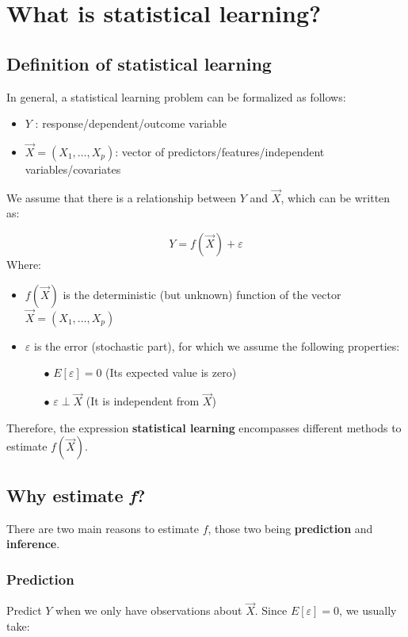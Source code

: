 \graphicspath{{chapters/images/0201/}}

\chapter{What is statistical learning?}
  
  \section{Definition of statistical learning}
    In general, a statistical learning problem can be formalized as follows:

    \begin{itemize}
      \item $Y$ : response/dependent/outcome variable
      \item $\vec{X} = (X_1, \dots, X_p)$: vector of predictors/features/independent variables/covariates
    \end{itemize}
    We assume that there is a relationship between $Y$ and $\vec{X}$, which can be written as:

    $$Y = f(\vec{X}) + \varepsilon $$
    Where:
    \begin{itemize}
      \item $f(\vec{X})$ is the deterministic (but unknown) function of the vector $\vec{X} = (X_1, \dots, X_p)$
      \item $\varepsilon$ is the error (stochastic part), for which we assume the following properties:
      \begin{itemize}
        \item[$\bullet$] $E[\varepsilon] = 0$ (Its expected value is zero)
        \item[$\bullet$] $\varepsilon \perp \vec{X}$ (It is independent from $\vec{X}$)
      \end{itemize}
    \end{itemize}
    Therefore, the expression \textbf{statistical learning} encompasses different methods to estimate $f(\vec{X})$. 

  \section{Why estimate \textit{f}?}
    There are two main reasons to estimate $f$, those two being \textbf{prediction} and \textbf{inference}.
  
    \subsection{Prediction}
      Predict $Y$ when we only have observations about $\vec{X}$. Since $E[\varepsilon] = 0$, we usually take:

